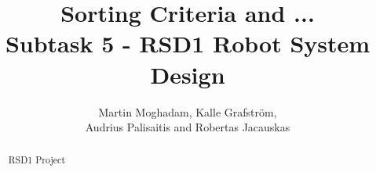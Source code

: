 \documentclass[a4paper]{article}	%
\begin{document}
\begin{titlepage}
\title{\Huge \bfseries Sorting Criteria and ... \vspace{3 mm}\\ \Large \normalfont Subtask 5 - RSD1 Robot System Design\vspace{10mm}}   %
\author{Martin Moghadam, Kalle Grafstr\"{o}m, \\ Audrius Palisaitis and Robertas Jacauskas}         %
\maketitle

\begin{abstract}
RSD1 Project
\end{abstract}

\end{titlepage}


\setcounter{page}{1}

\newpage
\tableofcontents
\newpage

\setcounter{page}{1}









\newpage




\nocite{bib1} 
\nocite{bib2}
\nocite{bib3}
\nocite{bib4}
\nocite{bib5}
\nocite{bib6}
\nocite{bib7}



\newpage

\end{document}
